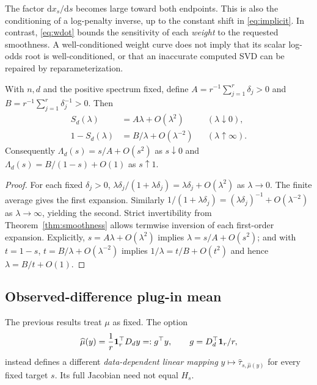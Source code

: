 \begin{remark}\label{rem:cond}
The factor $\mathrm dx_s/\mathrm ds$ becomes large toward both
endpoints. This is also the conditioning of a log-penalty inverse,
up to the constant shift in \eqref{eq:implicit}. In contrast,
\eqref{eq:wdot} bounds the sensitivity of each \emph{weight} to
the requested smoothness. A well-conditioned weight curve does not
imply that its scalar log-odds root is well-conditioned, or that
an inaccurate computed SVD can be repaired by reparameterization.
\end{remark}

\begin{proposition}\label{prop:asymptotic}
With $n,d$ and the positive spectrum fixed, define
$A=r^{-1}\sum_{j=1}^r\delta_j>0$ and
$B=r^{-1}\sum_{j=1}^r\delta_j^{-1}>0$.
Then
\begin{align}
S_d(\lambda)&=A\lambda+O(\lambda^2)
 &&(\lambda\downarrow0),\\
1-S_d(\lambda)&=B/\lambda+O(\lambda^{-2})
 &&(\lambda\uparrow\infty).
\end{align}
Consequently $\Lambda_d(s)=s/A+O(s^2)$ as $s\downarrow0$
and $\Lambda_d(s)=B/(1-s)+O(1)$ as $s\uparrow1$.
\end{proposition}
\begin{proof}
For each fixed $\delta_j>0$,
$\lambda\delta_j/(1+\lambda\delta_j)
=\lambda\delta_j+O(\lambda^2)$ as $\lambda\to0$.
The finite average gives the first expansion. Similarly
$1/(1+\lambda\delta_j)
=(\lambda\delta_j)^{-1}+O(\lambda^{-2})$
as $\lambda\to\infty$, yielding the second.
Strict invertibility from Theorem~\ref{thm:smoothness} allows
termwise inversion of each first-order expansion. Explicitly,
$s=A\lambda+O(\lambda^2)$ implies
$\lambda=s/A+O(s^2)$; and with $t=1-s$,
$t=B/\lambda+O(\lambda^{-2})$ implies
$1/\lambda=t/B+O(t^2)$ and hence
$\lambda=B/t+O(1)$.
\end{proof}

\subsection{Observed-difference plug-in mean}
The previous results treat $\mu$ as fixed. The option
\begin{equation}\label{eq:plug}
\widehat\mu(y)=\frac1r\mathbf 1_r^\top D_dy
=:g^\top y,\qquad g=D_d^\top\mathbf 1_r/r,
\end{equation}
instead defines a different \emph{data-dependent linear mapping}
$y\mapsto\widehat\tau_{s,\widehat\mu(y)}$ for every fixed target $s$.
Its full Jacobian need not equal $H_s$.

